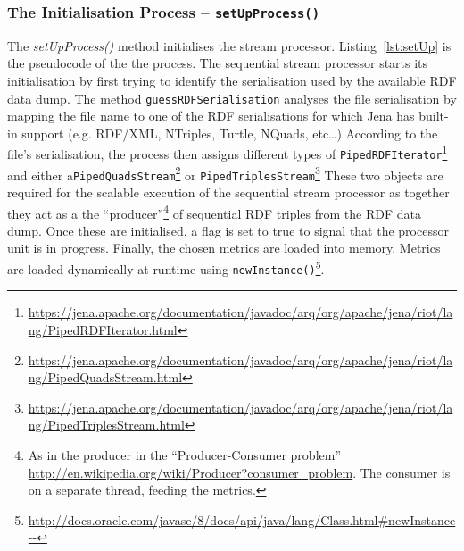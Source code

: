 
\subsubsection{The Initialisation Process – \texttt{setUpProcess()}}
The \emph{setUpProcess()} method initialises the stream processor.
Listing~\ref{lst:setUp} is the pseudocode of the the process.
The sequential stream processor starts its initialisation by first trying to identify the serialisation used by the available RDF data dump.
The method \texttt{guessRDFSerialisation} analyses the file serialisation by mapping the file name to one of the RDF serialisations for which Jena has built-in support (e.g. RDF/XML, NTriples, Turtle, NQuads, etc\dots)
According to the file's serialisation, the process then assigns different types of \texttt{PipedRDFIterator}\footnote{\url{https://jena.apache.org/documentation/javadoc/arq/org/apache/jena/riot/lang/PipedRDFIterator.html}} and either a\texttt{PipedQuadsStream}\footnote{\url{https://jena.apache.org/documentation/javadoc/arq/org/apache/jena/riot/lang/PipedQuadsStream.html}} or \texttt{PipedTriplesStream}\footnote{\url{https://jena.apache.org/documentation/javadoc/arq/org/apache/jena/riot/lang/PipedTriplesStream.html}} 
These two objects are required for the scalable execution of the sequential stream processor as together they act as a the ``producer''\footnote{As in the producer in the ``Producer-Consumer problem'' \url{http://en.wikipedia.org/wiki/Producer?consumer_problem}. The consumer is on a separate thread, feeding the metrics.} of sequential RDF triples from the RDF data dump.
Once these are initialised, a flag is set to true to signal that the processor unit is in progress.
Finally, the chosen metrics are loaded into memory.
Metrics are loaded dynamically at runtime using \texttt{newInstance()}\footnote{\url{http://docs.oracle.com/javase/8/docs/api/java/lang/Class.html#newInstance--}}. 

